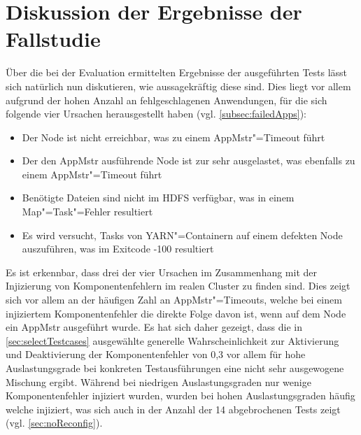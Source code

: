 \section{Diskussion der Ergebnisse der Fallstudie}
\label{sec:discussionResults}

Über die bei der Evaluation ermittelten Ergebnisse der ausgeführten Tests lässt sich natürlich nun diskutieren, wie aussagekräftig diese sind.
Dies liegt vor allem aufgrund der hohen Anzahl an fehlgeschlagenen Anwendungen, für die sich folgende vier Ursachen herausgestellt haben (vgl. \cref{subsec:failedApps}):

\begin{itemize}
    \item Der Node ist nicht erreichbar, was zu einem \gls{AppMstr}"=Timeout führt
    \item Der den \gls{AppMstr} ausführende Node ist zur sehr ausgelastet, was ebenfalls zu einem \gls{AppMstr}"=Timeout führt
    \item Benötigte Dateien sind nicht im HDFS verfügbar, was in einem Map"=Task"=Fehler resultiert
    \item Es wird versucht, Tasks von YARN"=Containern auf einem defekten Node auszuführen, was im Exitcode -100 resultiert
\end{itemize}

Es ist erkennbar, dass drei der vier Ursachen im Zusammenhang mit der Injizierung von Komponentenfehlern im realen Cluster zu finden sind.
Dies zeigt sich vor allem an der häufigen Zahl an \gls{AppMstr}"=Timeouts, welche bei einem injiziertem Komponentenfehler die direkte Folge davon ist, wenn auf dem Node ein \gls{AppMstr} ausgeführt wurde.
Es hat sich daher gezeigt, dass die in \cref{sec:selectTestcases} ausgewählte generelle Wahrscheinlichkeit zur Aktivierung und Deaktivierung der Komponentenfehler von 0,3 vor allem für hohe Auslastungsgrade bei konkreten Testausführungen eine nicht sehr ausgewogene Mischung ergibt.
Während bei niedrigen Auslastungsgraden nur wenige Komponentenfehler injiziert wurden, wurden bei hohen Auslastungsgraden häufig welche injiziert, was sich auch in der Anzahl der 14 abgebrochenen Tests zeigt (vgl. \cref{sec:noReconfig}).

